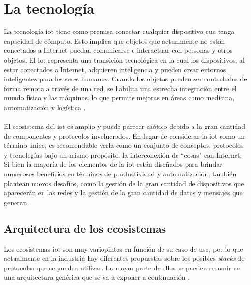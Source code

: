 \section{La tecnología }
\label{iot}

La tecnología \gls{iot} tiene como premisa conectar cualquier dispositivo  que tenga capacidad de cómputo. Esto implica que objetos que actualmente no están conectados a Internet puedan comunicarse e interactuar con personas y otros objetos. El \gls{iot} representa una transición tecnológica en la cual los dispositivos, al estar conectados a Internet, adquieren inteligencia y pueden crear entornos inteligentes para los seres humanos. Cuando los objetos pueden ser controlados de forma remota a través de una red, se habilita una estrecha integración entre el mundo físico y las máquinas, lo que permite mejoras en áreas como medicina, automatización y logística \cite{7073822}.\\
\\
El ecosistema del \gls{iot} es amplio y puede parecer caótico debido a la gran cantidad de componentes y protocolos involucrados. En lugar de considerar la \gls{iot} como un término único, es recomendable verla como un conjunto de conceptos, protocolos y tecnologías bajo un mismo propósito: la interconexión de ``cosas" con Internet. Si bien la mayoría de los elementos de la \gls{iot} están diseñados para brindar numerosos beneficios en términos de productividad y automatización, también plantean nuevos desafíos, como la gestión de la gran cantidad de dispositivos que aparecerán en las redes y la gestión de la gran cantidad de datos y mensajes que generan \cite{iotreview}.

\subsection{Arquitectura de los ecosistemas }


Los ecosistemas \gls{iot} son muy variopintos en función de su caso de uso, por lo que actualmente en la industria hay diferentes propuestas sobre los posibles \textit{stacks} de protocolos que se pueden utilizar. La mayor parte de ellos se pueden resumir en una arquitectura genérica que se va a exponer a continuación \cite{iotreview}.

